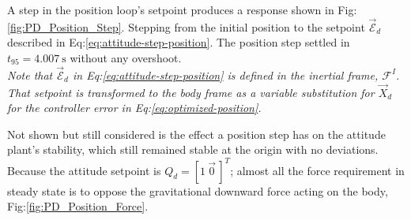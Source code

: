 A step in the position loop's setpoint produces a response shown in Fig:\ref{fig:PD_Position_Step}. Stepping from the initial position to the setpoint $\vec{\mathcal{E}}_d$ described in Eq:\ref{eq:attitude-step-position}. The position step settled in $t_{95}=4.007~\text{s}$ without any overshoot. 
\\
\emph{\color{Gray}Note that $\vec{\mathcal{E}}_d$ in Eq:\ref{eq:attitude-step-position} is defined in the inertial frame, $\mathcal{F}^{I}$. That setpoint is transformed to the body frame as a variable substitution for $\vec{X}_d$ for the controller error in Eq:\ref{eq:optimized-position}.}
\par
Not shown but still considered is the effect a position step has on the attitude plant's stability, which still remained stable at the origin with no deviations. Because the attitude setpoint is $Q_d=[1~\vec{0}\hspace{2pt}]^T$; almost all the force requirement in steady state is to oppose the gravitational downward force acting on the body, Fig:\ref{fig:PD_Position_Force}.
